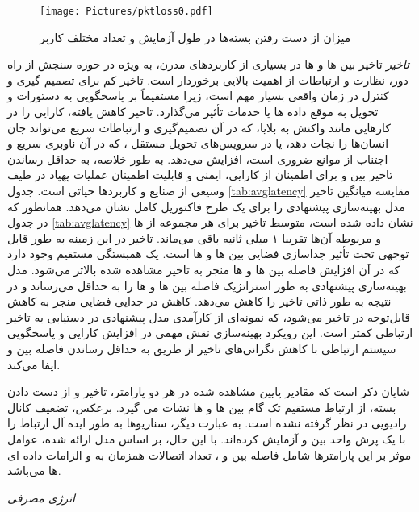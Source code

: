 \begin{itemize}
{		\begin{figure}%
			\centering
			\texttt{[image: Pictures/pktloss0.pdf]}
			\caption{میزان از دست رفتن بسته‌ها در طول آزمایش و تعداد مختلف کاربر}
			\label{fig:PacketLossPlot}
		\end{figure}
	\item \textit{تاخیر}
	تاخیر بین ها و ها در بسیاری از کاربردهای مدرن، به ویژه در حوزه سنجش از راه دور، نظارت و ارتباطات از اهمیت بالایی برخوردار است. تاخیر کم برای تصمیم گیری و کنترل در زمان واقعی بسیار مهم است، زیرا مستقیماً بر پاسخگویی  به دستورات  و تحویل به موقع داده ها یا خدمات تأثیر می‌گذارد. تاخیر کاهش یافته، کارایی  را در کارهایی مانند واکنش به بلایا، که در آن تصمیم‌گیری و ارتباطات سریع می‌تواند جان انسان‌ها را نجات دهد، یا در سرویس‌های تحویل مستقل ، که در آن ناوبری سریع و اجتناب از موانع ضروری است، افزایش می‌دهد. به طور خلاصه، به حداقل رساندن تاخیر بین  و  برای اطمینان از کارایی، ایمنی و قابلیت اطمینان عملیات پهپاد در طیف وسیعی از صنایع و کاربردها حیاتی است.
	جدول \ref{tab:avglatency} مقایسه میانگین تاخیر مدل بهینه‌سازی پیشنهادی را برای یک طرح فاکتوریل کامل نشان می‌دهد. همانطور که در جدول \ref{tab:avglatency} نشان داده شده است، متوسط ​​تاخیر برای هر مجموعه از ها و  مربوطه آن‌ها تقریبا ۱ میلی ثانیه باقی می‌ماند.
	تاخیر در این زمینه به طور قابل توجهی تحت تأثیر جداسازی فضایی بین ها و ها است. یک همبستگی مستقیم وجود دارد که در آن افزایش فاصله بین ها و ها منجر به تاخیر مشاهده شده بالاتر می‌شود. مدل بهینه‌سازی پیشنهادی به طور استراتژیک فاصله بین ها و ها را به حداقل می‌رساند و در نتیجه به طور ذاتی تاخیر را کاهش می‌دهد. کاهش در جدایی فضایی منجر به کاهش قابل‌توجه در تاخیر می‌شود، که نمونه‌ای از کارآمدی مدل پیشنهادی در دستیابی به تاخیر ارتباطی کمتر است. این رویکرد بهینه‌سازی نقش مهمی در افزایش کارایی و پاسخگویی سیستم ارتباطی با کاهش نگرانی‌های تاخیر از طریق به حداقل رساندن فاصله بین  و  ایفا می‌کند.	

	شایان ذکر است که مقادیر پایین مشاهده شده در هر دو پارامتر، تاخیر و از دست دادن بسته، از ارتباط مستقیم تک گام بین ها و ها نشات می گیرد. برعکس، تضعیف کانال رادیویی در نظر گرفته نشده است. به عبارت دیگر، سناریوها به طور ایده آل ارتباط را با یک پرش واحد بین  و  آزمایش کرده‌اند. با این حال، بر اساس مدل ارائه شده، عوامل موثر بر این پارامترها شامل فاصله بین  و ، تعداد اتصالات همزمان به  و الزامات داده ای ها می‌باشد.
	\item \textit{انرژی مصرفی}
}
\end{itemize}
